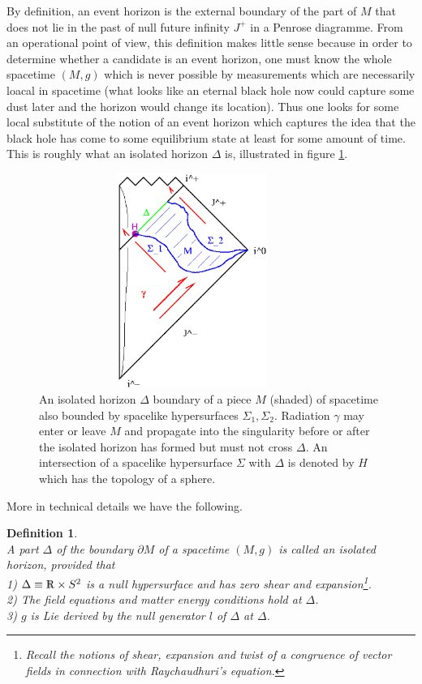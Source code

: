 \documentclass[12pt]{report}
\newtheorem{Definition}{Definition}[section]
\def\Rl{{\mathchoice
{\setbox0=\hbox{$\displaystyle\rm R$}\hbox{\hbox to0pt
{\kern0.4\wd0\vrule height0.9\ht0\hss}\box0}}
{\setbox0=\hbox{$\textstyle\rm R$}\hbox{\hbox to0pt
{\kern0.4\wd0\vrule height0.9\ht0\hss}\box0}}
{\setbox0=\hbox{$\scriptstyle\rm R$}\hbox{\hbox to0pt
{\kern0.4\wd0\vrule height0.9\ht0\hss}\box0}}
{\setbox0=\hbox{$\scriptscriptstyle\rm R$}\hbox{\hbox to0pt
{\kern0.4\wd0\vrule height0.9\ht0\hss}\box0}}}}
\begin{document}
By definition, an 
event horizon is the external boundary of the part of $M$ that does not
lie in the past of null future infinity $J^+$ in a Penrose 
diagramme. From an operational point of view, this definition makes little 
sense because in order to determine whether a candidate is an event 
horizon, one must know the whole spacetime $(M,g)$ which is never possible 
by measurements which are necessarily loacal in spacetime (what looks like 
an eternal black hole now could capture some dust later and the horizon 
would change its location). Thus one looks for some local substitute 
of the notion of an event horizon which captures the idea that the black 
hole has come to some equilibrium state at least for some amount of time.
This is roughly what an isolated horizon $\Delta$ is, illustrated 
in figure \ref{f13}.
%
\begin{figure}
\includegraphics[width=10cm,height=7cm]{proc9fig13.ps}
\caption{An isolated horizon $\Delta$ boundary of a piece $M$ (shaded) of 
spacetime 
also bounded by spacelike hypersurfaces $\Sigma_1,\Sigma_2$. 
Radiation $\gamma$ may enter or leave $M$ and propagate into the 
singularity before or after the isolated horizon has formed but must 
not cross $\Delta$. An intersection of a spacelike hypersurface $\Sigma$
with $\Delta$ is denoted by $H$ which has the topology of a sphere.} 
\label{f13}
\end{figure}
%
More in technical details we have the following.
%
\begin{Definition} \label{def3.4.1} ~~~~\\
A part $\Delta$ of the boundary $\partial M$ of a spacetime $(M,g)$ is 
called an isolated horizon, provided that\\
1) $\Delta\equiv \Rl\times S^2$ is a null hypersurface and has zero shear
and expansion\footnote{Recall the notions of shear, expansion and twist
of a congruence of vector fields in connection with Raychaudhuri's 
equation.}.\\
2) The field equations and matter energy conditions hold at $\Delta$.\\
3) $g$ is Lie derived by the null generator $l$ of $\Delta$ at $\Delta$.   
\end{Definition}
\end{document}
